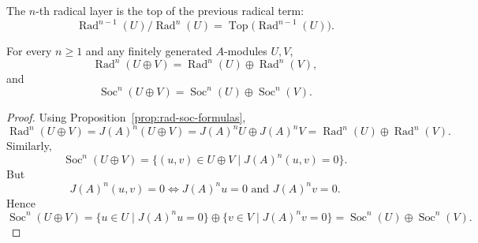\begin{remark}
    The $n$-th radical layer is the top of the previous radical term:
    \[
        \operatorname{Rad}^{n-1}(U)/\operatorname{Rad}^{n}(U)
        =
        \operatorname{Top}\bigl(\operatorname{Rad}^{n-1}(U)\bigr).
    \]
\end{remark}

\begin{lemma}\label{lem:rad-soc-direct-sum}
    For every $n\ge 1$ and any finitely generated $A$-modules $U,V$,
    \[
        \operatorname{Rad}^n(U\oplus V)=\operatorname{Rad}^n(U)\oplus \operatorname{Rad}^n(V),
    \]
    and
    \[
        \operatorname{Soc}^n(U\oplus V)=\operatorname{Soc}^n(U)\oplus \operatorname{Soc}^n(V).
    \]
\end{lemma}

\begin{proof}
    Using Proposition~\ref{prop:rad-soc-formulas},
    \[
        \operatorname{Rad}^n(U\oplus V)
        =
        J(A)^n(U\oplus V)
        =
        J(A)^nU\oplus J(A)^nV
        =
        \operatorname{Rad}^n(U)\oplus \operatorname{Rad}^n(V).
    \]
    Similarly,
    \[
        \operatorname{Soc}^n(U\oplus V)
        =
        \{(u,v)\in U\oplus V\mid J(A)^n(u,v)=0\}.
    \]
    But
    \[
        J(A)^n(u,v)=0
        \iff
        J(A)^n u=0 \text{ and } J(A)^n v=0.
    \]
    Hence
    \[
        \operatorname{Soc}^n(U\oplus V)
        =
        \{u\in U\mid J(A)^n u=0\}
        \oplus
        \{v\in V\mid J(A)^n v=0\}
        =
        \operatorname{Soc}^n(U)\oplus \operatorname{Soc}^n(V).
    \]
\end{proof}

